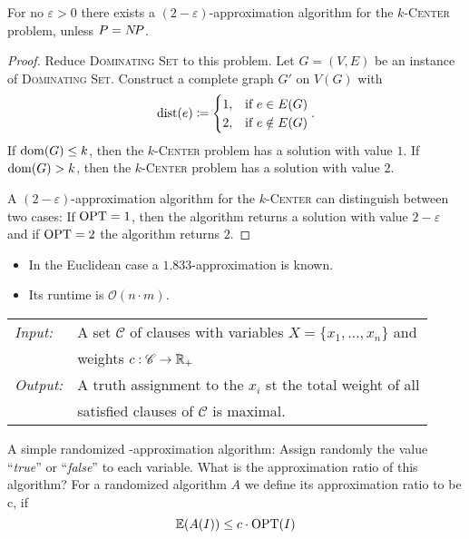 \documentclass[../skript.tex]{subfiles}
\begin{document}
\begin{theorem} %
\label{thm:26}
For no $\varepsilon > 0$ there exists a $(2-\varepsilon)$-approximation algorithm for the \textsc{$k$-Center} problem, unless $P = N \! P$.
\end{theorem}
\begin{proof}
Reduce \textsc{Dominating Set} to this problem.
Let $G = (V, E)$ be an instance of \textsc{Dominating Set}.
Construct a complete graph $G'$ on $V(G)$ with
\[
	\operatorname*{dist}(e) \coloneqq \begin{cases}
	1, & \text{if } e \in E(G) \\
	2, & \text{if } e \notin E(G) \\
	\end{cases}.
\]
If $\operatorname{dom}(G) \leq k$, then the \textsc{$k$-Center} problem has a solution with value $1$.
If $\operatorname{dom}(G) > k$, then the \textsc{$k$-Center} problem has a solution with value $2$.

A $(2-\varepsilon)$-approximation algorithm for the \textsc{$k$-Center} can distinguish between two cases: If $\operatorname{OPT} = 1$, then the algorithm returns a solution with value $2 - \varepsilon$ and if $\operatorname{OPT} = 2$ the algorithm returns $2$.
\end{proof}
\begin{remark}
\begin{itemize}
\item In the Euclidean case a $1.833$-approximation is known.
\item Its runtime is $\mathcal{O}(n\cdot m)$.
\end{itemize}
\end{remark}
\begin{problem}
\begin{tabular}{@{}ll}
\textit{Input:} & A set $\mathscr{C}$ of clauses with variables $X = \{ x_1, \ldots, x_n \}$ and \\
& weights $c : \mathscr{C} \to \mathbb{R}_+$ \\
\textit{Output:} & A truth assignment to the $x_i$ \ac{st} the total weight of all \\
& satisfied clauses of $\mathscr{C}$ is maximal.
\end{tabular}
\end{problem}
A simple randomized -approximation algorithm: Assign randomly the value ``\textit{true}'' or ``\textit{false}'' to each variable.
What is the approximation ratio of this algorithm?
For a randomized algorithm $A$ we define its approximation ratio to be c, if
\[
	\mathbb{E}(A(I)) \leq c \cdot \operatorname{OPT}(I)
\]
\end{document}
